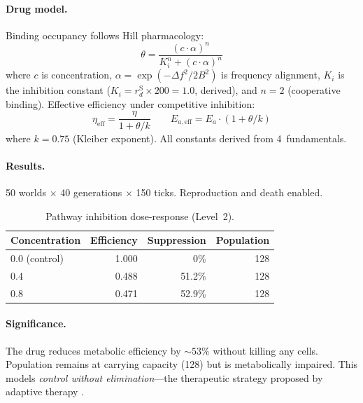 \documentclass[11pt,a4paper]{article}
\begin{document}
\paragraph{Drug model.}
Binding occupancy follows Hill pharmacology:
\begin{equation}
  \theta = \frac{(c \cdot \alpha)^n}{K_i^n + (c \cdot \alpha)^n}
  \label{eq:occupancy}
\end{equation}
where $c$ is concentration, $\alpha = \exp(-\Delta f^2 / 2B^2)$
is frequency alignment, $K_i$ is the inhibition constant
($K_i = r_d^{\text{S}} \times 200 = 1.0$, derived), and
$n = 2$ (cooperative binding).
Effective efficiency under competitive inhibition:
\begin{equation}
  \eta_{\text{eff}} = \frac{\eta}{1 + \theta / k}
  \qquad
  E_{a,\text{eff}} = E_a \cdot (1 + \theta / k)
\end{equation}
where $k = 0.75$ (Kleiber exponent). All constants derived from
4~fundamentals.

\paragraph{Results.}
50 worlds $\times$ 40 generations $\times$ 150 ticks.
Reproduction and death enabled.

\begin{table}[h]
\centering
\caption{Pathway inhibition dose-response (Level~2).}
\label{tab:pathway-results}
\small
\begin{tabular}{@{}lrrr@{}}
\toprule
\textbf{Concentration} & \textbf{Efficiency} & \textbf{Suppression} & \textbf{Population} \\
\midrule
0.0 (control) & 1.000 & 0\%    & 128 \\
0.4           & 0.488 & 51.2\% & 128 \\
0.8           & 0.471 & 52.9\% & 128 \\
\bottomrule
\end{tabular}
\end{table}

\paragraph{Significance.}
The drug reduces metabolic efficiency by ${\sim}53\%$ without
killing any cells. Population remains at carrying capacity (128)
but is metabolically impaired. This models \emph{control without
elimination}---the therapeutic strategy proposed by adaptive
therapy \citep{gatenby2009adaptive}.
\end{document}
